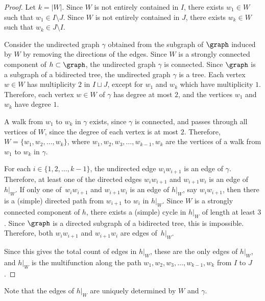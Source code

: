 \begin{proof}
    Let \(k = |W|\).
    Since \(W\) is not entirely contained in \(I\),
    there exists \(w_1 \in W\) such that \(w_1 \in I \setminus J\).
    Since \(W\) is not entirely contained in \(J\),
    there exists \(w_k \in W\) such that \(w_k \in J \setminus I\).

    Consider the undirected graph \(\gamma\) obtained from the subgraph of \(\graph\) induced by \(W\) by removing the directions of the edges.
    Since \(W\) is a strongly connected component of \(h \subset \graph\),
    the undirected graph \(\gamma\) is connected.
    Since \(\graph\) is a subgraph of a bidirected tree,
    the undirected graph \(\gamma\) is a tree.
    Each vertex \(w \in W\) has multiplicity \(2\) in \(I \sqcup J\), except for \(w_1\) and \(w_k\) which have multiplicity \(1\).
    Therefore, each vertex \(w \in W\) of \(\gamma\) has degree at most \(2\), and the vertices \(w_1\) and \(w_k\) have degree \(1\).

    A walk from \(w_1\) to \(w_k\) in \(\gamma\) exists, since \(\gamma\) is connected, and passes through all vertices of \(W\), since the degree of each vertex is at most \(2\).
    Therefore, \(W = \{w_1, w_2, \dots, w_k\}\),
    where \(w_1, w_2, w_3, \dots, w_{k-1}, w_k\) are the vertices of a walk from \(w_1\) to \(w_k\) in \(\gamma\).

    For each \(i \in \{1, 2, \dots, k-1\}\), the undirected edge \(w_i w_{i+1}\) is an edge of \(\gamma\).
    Therefore, at least one of the directed edges \(w_i w_{i+1}\) and \(w_{i+1} w_i\) is an edge of \(h|_W\).
    If only one of~\(w_i w_{i+1}\) and \(w_{i+1} w_i\) is an edge of \(h|_W\), say \(w_i w_{i+1}\), then there is a (simple) directed path from \(w_{i+1}\) to \(w_i\) in \(h|_W\).
    Since \(W\) is a strongly connected component of \(h\), there exists a (simple) cycle in \(h|_W\) of length at least \(3\).
    Since \(\graph\) is a directed subgraph of a bidirected tree, this is impossible.
    Therefore, both \(w_i w_{i+1}\) and \(w_{i+1} w_i\) are edges of~\(h|_W\).

    Since this gives the total count of edges in \(h|_W\),
    these are the only edges of \(h|_W\), and \(h|_W\) is the multifunction along the path \(w_1, w_2, w_3, \dots, w_{k-1}, w_k\) from \(I\) to \(J\).
\end{proof}

Note that the edges of \(h|_W\) are uniquely determined by \(W\) and \(\gamma\).

